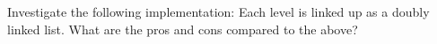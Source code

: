   Investigate the following implementation:
 Each level is linked up as a doubly linked list.
 What are the pros and cons compared to the above?
